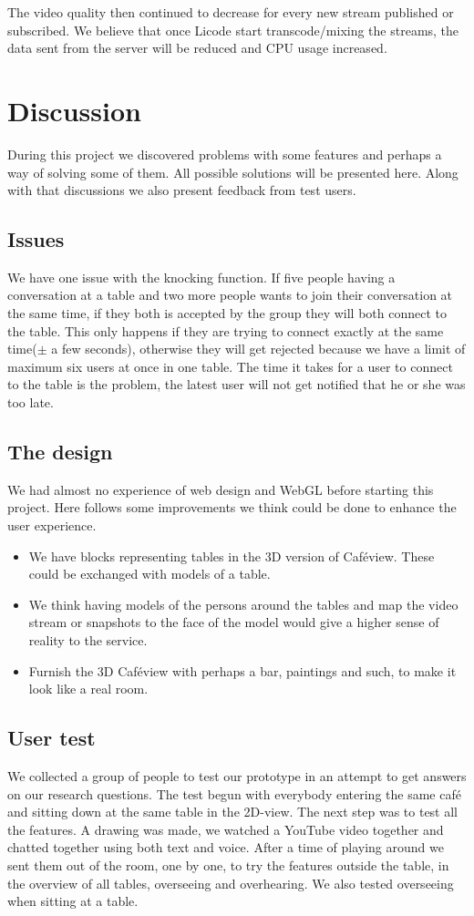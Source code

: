 \documentclass[12pt, titlepage]{article}
\begin{document}
The video quality then continued to decrease for every new stream published or subscribed. We believe that once Licode start transcode/mixing the streams, the data sent from the server will be reduced and CPU usage increased. 
\section{Discussion}
During this project we discovered problems with some features and perhaps a way of solving some of them. All possible solutions will be presented here. Along with that discussions we also present feedback from test users.
\subsection{Issues}
We have one issue with the knocking function. If five people having a conversation at a table and two more people wants to join their conversation at the same time, if they both is accepted by the group they will both connect to the table. This only happens if they are trying to connect exactly at the same time($\pm$ a few seconds), otherwise they will get rejected because we have a limit of maximum six users at once in one table. The time it takes for a user to connect to the table is the problem, the latest user will not get notified that he or she was too late. 
\subsection{The design}
We had almost no experience of web design and WebGL before starting this project. Here follows some improvements we think could be done to enhance the user experience.
\begin{itemize}
\item We have blocks representing tables in the 3D version of Caféview. These could be exchanged with models of a table. 
\item We think having models of the persons around the tables and map the video stream or snapshots to the face of the model would give a higher sense of reality to the service.
\item Furnish the 3D Caféview with perhaps a bar, paintings and such, to make it look like a real room.
\end{itemize}
\subsection{User test}
We collected a group of people to test our prototype in an attempt to get answers on our research questions. The test begun with everybody entering the same café and sitting down at the same table in the 2D-view. The next step was to test all the features. A drawing was made, we watched a YouTube video together and chatted together using both text and voice. After a time of playing around we sent them out of the room, one by one, to try the features outside the table, in the overview of all tables, overseeing and overhearing. We also tested overseeing when sitting at a table.
\end{document}
